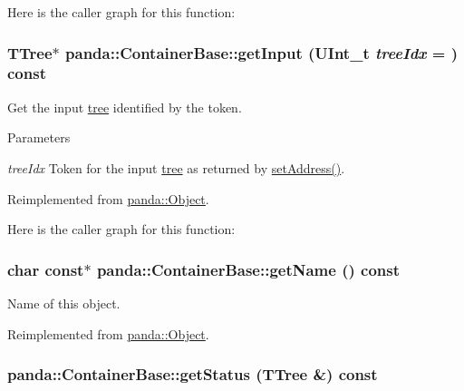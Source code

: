 Here is the caller graph for this function:\hypertarget{classpanda_1_1ContainerBase_aee836fc160acb4244a2dab856e9bb97a}{
\subsubsection[{getInput}]{\setlength{\rightskip}{0pt plus 5cm}TTree$\ast$ panda::ContainerBase::getInput (UInt\_\-t {\em treeIdx} = {}) const}}
\label{classpanda_1_1ContainerBase_aee836fc160acb4244a2dab856e9bb97a}


Get the input \hyperlink{namespacepanda_1_1tree}{tree} identified by the token. 
\begin{DoxyParams}{Parameters}
\item[{\em treeIdx}]Token for the input \hyperlink{namespacepanda_1_1tree}{tree} as returned by \hyperlink{classpanda_1_1ContainerBase_ad5fdf0c76a93e2c5ae563ad34b268e43}{setAddress()}. \end{DoxyParams}


Reimplemented from \hyperlink{classpanda_1_1Object_a69038e1ce9bc60222bb0ba7e7f933bd5}{panda::Object}.

Here is the caller graph for this function:\hypertarget{classpanda_1_1ContainerBase_a1d34d04ba62ea436b805c73f3e5a7e04}{
\subsubsection[{getName}]{\setlength{\rightskip}{0pt plus 5cm}char const$\ast$ panda::ContainerBase::getName () const}}
\label{classpanda_1_1ContainerBase_a1d34d04ba62ea436b805c73f3e5a7e04}


Name of this object. 

Reimplemented from \hyperlink{classpanda_1_1Object_a670b2150de796b6fc742fa9de30cd6b1}{panda::Object}.\hypertarget{classpanda_1_1ContainerBase_a0fc7be3775bfe31f3819356d1cacda11}{
\subsubsection[{getStatus}]{ panda::ContainerBase::getStatus (TTree \&) const}}
\label{classpanda_1_1ContainerBase_a0fc7be3775bfe31f3819356d1cacda11}


